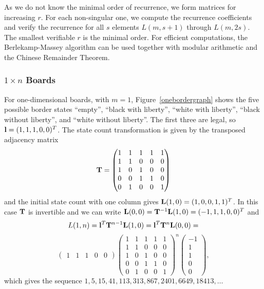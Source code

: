 \documentclass{article}
\begin{document}
As we do not know the minimal order of recurrence, we form
matrices for increasing $r$. For each non-singular one, we
compute the recurrence coefficients and verify the recurrence for
all $s$ elements $L(m,s+1)$ through $L(m,2s)$.
The smallest verifiable $r$ is the minimal order.
For efficient computations, the Berlekamp-Massey algorithm
\cite{B83} can be used together with modular arithmetic and the
Chinese Remainder Theorem.

\subsubsection{$1 \times n$ Boards}
\label{1xn-boards}

For one-dimensional boards, with $m=1$, Figure~\ref{onebordergraph} shows
the five possible border
states ``empty'', ``black with liberty'', ``white with liberty'',
``black without liberty'', and ``white without liberty''. The first
three are legal, so $\mathbf{l} = (1,1,1,0,0)^T$. The state count
transformation is given by the transposed adjacency matrix
\[
  \mathbf{T} =
  \begin{pmatrix}
    1 & 1 & 1 & 1 & 1 \\
    1 & 1 & 0 & 0 & 0 \\
    1 & 0 & 1 & 0 & 0 \\
    0 & 0 & 1 & 1 & 0 \\
    0 & 1 & 0 & 0 & 1
  \end{pmatrix}
\]
and the initial state count with one column gives $\mathbf{L}(1,0) = (1,0,0,1,1)^T$.
In this case $\mathbf{T}$ is invertible and we can write
$\mathbf{L}(0,0) = \mathbf{T}^{-1} \mathbf{L}(1,0) = (-1,1,1,0,0)^T$ and
\[
  L(1,n) = \mathbf{l}^T \mathbf{T}^{n-1} \mathbf{L}(1,0)= \mathbf{l}^T \mathbf{T}^n \mathbf{L}(0,0) =
\]
\[
  \begin{pmatrix}
    1 & 1 & 1 & 0 & 0 
  \end{pmatrix}
  \begin{pmatrix}
    1 & 1 & 1 & 1 & 1 \\
    1 & 1 & 0 & 0 & 0 \\
    1 & 0 & 1 & 0 & 0 \\
    0 & 0 & 1 & 1 & 0 \\
    0 & 1 & 0 & 0 & 1
  \end{pmatrix}^n
  \begin{pmatrix}
    -1 \\ 1 \\ 1 \\ 0 \\ 0 
  \end{pmatrix},
\]
which gives the sequence $1,5,15,41,113,313,867,2401,6649,18413,\dots$
\end{document}
